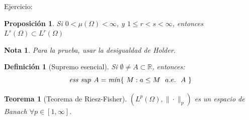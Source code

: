 \documentclass[11pt, a4paper]{article}
\newif\IfInSansMode
\newcommand{\R}{\mathbb{R}} \newcommand{\N}{\mathbb{N}}
\theoremstyle{theorem-style}
\newtheorem{nth}{Teorema}[section]
\newtheorem{nprop}{Proposición}[section]
\theoremstyle{definition-style}
\newtheorem{ndef}{Definición}[section]
\theoremstyle{remark-style}
\newtheorem*{nota}{Nota}
\theoremstyle{example-style}
\begin{document}
Ejercicio:
\begin{nprop}
  Si $0 < \mu(\Omega) < \infty$, y $1\leq r < s < \infty $, entonces $L^s(\Omega) \subset L^r(\Omega)$
\end{nprop}
\begin{nota}
  Para la prueba, usar la desigualdad de Holder.
\end{nota}

\begin{ndef}[Supremo esencial]
  Si $\emptyset \ne A \subset \R$, entonces:
  \[
    \text{\textit{ess sup }} A = \text{\textit{mín}}\{ \ M : a \leq M \ \ a.e. \ \ A \ \}
  \]
\end{ndef}

\begin{nth}[Teorema de Riesz-Fisher]
  $( L^p(\Omega), \| \cdot \|_p)$ es un espacio de Banach $\forall p \in [1,\infty]$.
\end{nth}
\end{document}

